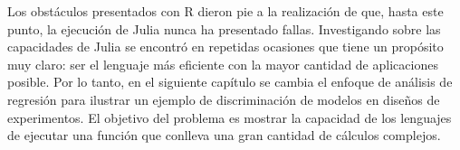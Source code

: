 Los obstáculos presentados con \textsf{R} dieron pie a la realización de que, hasta este punto, la ejecución de \textsf{Julia} nunca ha presentado fallas. Investigando sobre las capacidades de \textsf{Julia} se encontró en repetidas ocasiones que tiene un propósito muy claro: ser  el lenguaje más eficiente con la mayor cantidad de aplicaciones posible. Por lo tanto, en el siguiente capítulo se cambia el enfoque de análisis de regresión para ilustrar un ejemplo de discriminación de modelos en diseños de experimentos. El objetivo del problema es mostrar la capacidad de los lenguajes de ejecutar una función que conlleva una gran cantidad de cálculos complejos. 

